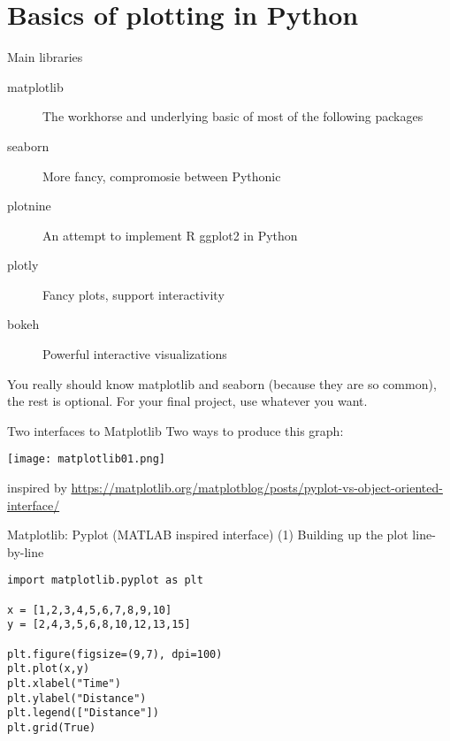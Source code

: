 \section{Basics of plotting in Python}



\begin{frame}{Main libraries}
  
\begin{description}
\item[matplotlib] The workhorse and underlying basic of most of the following packages
\item[seaborn] More fancy, compromosie between Pythonic
\item[plotnine] An attempt to implement R ggplot2 in Python
\item[plotly] Fancy plots, support interactivity
\item[bokeh] Powerful interactive visualizations
\end{description}

\pause

You really should know matplotlib and seaborn (because they are so common), the rest is optional. For your final project, use whatever you want.

\end{frame}




\begin{frame}[fragile]{Two interfaces to Matplotlib}
  Two ways to produce this graph:
  
  \centering
\texttt{[image: matplotlib01.png]}\hfill


\tiny inspired by \url{https://matplotlib.org/matplotblog/posts/pyplot-vs-object-oriented-interface/}


\end{frame}



\begin{frame}[fragile]{Matplotlib: Pyplot (MATLAB inspired interface)}
(1) Building up the plot line-by-line
  
\begin{verbatim}
import matplotlib.pyplot as plt

x = [1,2,3,4,5,6,7,8,9,10]
y = [2,4,3,5,6,8,10,12,13,15]

plt.figure(figsize=(9,7), dpi=100)
plt.plot(x,y)
plt.xlabel("Time")
plt.ylabel("Distance")
plt.legend(["Distance"])
plt.grid(True)
\end{verbatim}

 
\end{frame}


